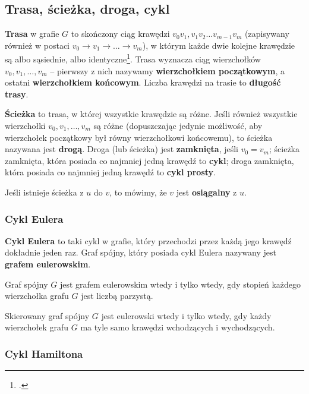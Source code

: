 \subsection*{Trasa, ścieżka, droga, cykl}

\textbf{Trasa} w grafie $G$ to skończony ciąg krawędzi $v_0v_1,v_1v_2\ldots v_{m-1}v_m$ (zapisywany również w postaci $v_0 \rightarrow v_1 \rightarrow \ldots \rightarrow v_m$), w którym każde dwie kolejne krawędzie są albo sąsiednie, albo identyczne\footcite[41]{wilson}. Trasa wyznacza ciąg wierzchołków $v_0,v_1,\ldots,v_m$ -- pierwszy z nich nazywamy \textbf{wierzchołkiem początkowym}, a ostatni \textbf{wierzchołkiem końcowym}. Liczba krawędzi na trasie to \textbf{długość trasy}. 

\textbf{Ścieżka} to trasa, w której wszystkie krawędzie są różne. Jeśli również wszystkie wierzchołki $v_0,v_1,\ldots,v_m$ są różne (dopuszczając jedynie możliwość, aby wierzchołek początkowy był równy wierzchołkowi końcowemu), to ścieżka nazywana jest \textbf{drogą}. Droga (lub ścieżka) jest \textbf{zamknięta}, jeśli $v_0 = v_m$; ścieżka zamknięta, która posiada co najmniej jedną krawędź to \textbf{cykl}; droga zamknięta, która posiada co najmniej jedną krawędź to \textbf{cykl prosty}.

Jeśli istnieje ścieżka z $u$ do $v$, to mówimy, że $v$ jest \textbf{osiągalny} z $u$.

\subsubsection*{Cykl Eulera}

\textbf{Cykl Eulera} to taki cykl w grafie, który przechodzi przez każdą jego krawędź dokładnie jeden raz. Graf spójny, który posiada cykl Eulera nazywany jest \textbf{grafem eulerowskim}. 

\begin{theorem}[Euler, 1736]
Graf spójny $G$ jest grafem eulerowskim wtedy i tylko wtedy, gdy stopień każdego wierzchołka grafu $G$ jest liczbą parzystą.
\end{theorem}

\begin{theorem}
Skierowany graf spójny $G$ jest eulerowski wtedy i tylko wtedy, gdy każdy wierzchołek grafu $G$ ma tyle samo krawędzi wchodzących i wychodzących.
\end{theorem}
	
\subsubsection*{Cykl Hamiltona}

